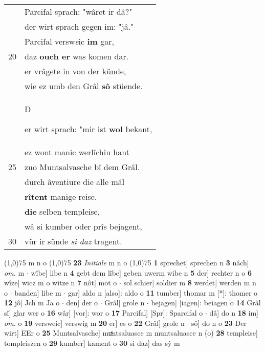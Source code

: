 \documentclass[8pt,a4paper,notitlepage]{article}
\begin{document}
\begin{table}[ht]
\begin{minipage}[t]{0.5\linewidth}
\begin{tabular}{rl}
 & Parcifal sprach: "wâret ir dâ?"\\ 
 & der wirt sprach gegen im: "jâ."\\ 
 & Parcifal versw\textit{e}ic \textbf{im} gar,\\ 
20 & daz \textbf{ouch er} was komen dar.\\ 
 & er vrâgete in von der künde,\\ 
 & wie ez umb den Grâl \textbf{sô} stüende.\\ 
 & \begin{large}D\end{large}er wirt sprach: "mir ist \textbf{wol} bekant,\\ 
 & ez wont manic werlîchiu hant\\ 
25 & zuo Muntsalvasche bî dem Grâl.\\ 
 & durch âventiure die alle mâl\\ 
 & \textbf{rîtent} manige reise.\\ 
 & \textbf{die} selben templeise,\\ 
 & wâ si kumber oder prîs bejagent,\\ 
30 & vür ir sünde \textit{si daz} tragent.\\ 
\end{tabular}
\scriptsize
\line(1,0){75} \newline
m n o \newline
\line(1,0){75} \newline
\textbf{23} \textit{Initiale} m n o  \newline
\line(1,0){75} \newline
\textbf{1} sprechet] sprechen n \textbf{3} nâch] \textit{om.} m  $\cdot$ wîbe] libe n \textbf{4} gebt dem lîbe] geben uwerm wibe n \textbf{5} der] rechter n o \textbf{6} wîze] wicz m o witze n \textbf{7} nôt] mot o  $\cdot$ sol schier] soldier m \textbf{8} werdet] werden m n o  $\cdot$ banden] libe m  $\cdot$ gar] aldo n [also]: aldo o \textbf{11} tumber] thomar m [*]: thomer o \textbf{12} jô] Jch m Ja o  $\cdot$ den] der o  $\cdot$ Grâl] grole n  $\cdot$ bejagen] [iagen]: beiagen o \textbf{14} Grâl sî] glar wer o \textbf{16} wâr] [vor]: wor o \textbf{17} Parcifal] [Spr]: Sparcifal o  $\cdot$ dâ] do n \textbf{18} im] \textit{om.} o \textbf{19} versweic] verswig m \textbf{20} er] es o \textbf{22} Grâl] grole n  $\cdot$ sô] do n o \textbf{23} Der wirt] EEr o \textbf{25} Muntsalvasche] muͯntsaluasce m muntsaluasce n (o) \textbf{28} templeise] tompleiszen o \textbf{29} kumber] kament o \textbf{30} si daz] das sẏ m \newline
\end{minipage}
\end{table}
\end{document}
